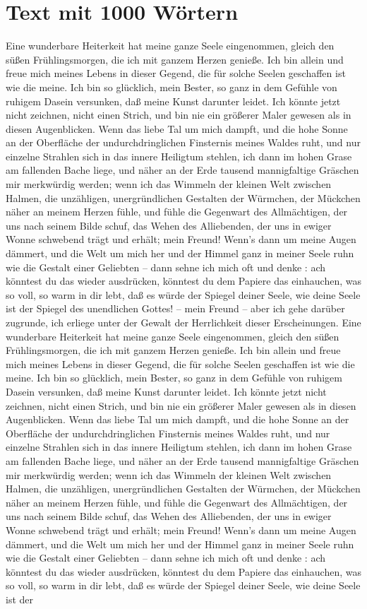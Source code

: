 \documentclass{scrreprt}
\begin{document}
	\chapter{Text mit 1000 Wörtern}
	Eine wunderbare Heiterkeit hat meine ganze Seele eingenommen, gleich den süßen Frühlingsmorgen, die ich mit ganzem Herzen genieße. Ich bin allein und freue mich meines Lebens in dieser Gegend, die für solche Seelen geschaffen ist wie die meine. Ich bin so glücklich, mein Bester, so ganz in dem Gefühle von ruhigem Dasein versunken, daß meine Kunst darunter leidet. Ich könnte jetzt nicht zeichnen, nicht einen Strich, und bin nie ein größerer Maler gewesen als in diesen Augenblicken. Wenn das liebe Tal um mich dampft, und die hohe Sonne an der Oberfläche der undurchdringlichen Finsternis meines Waldes ruht, und nur einzelne Strahlen sich in das innere Heiligtum stehlen, ich dann im hohen Grase am fallenden Bache liege, und näher an der Erde tausend mannigfaltige Gräschen mir merkwürdig werden; wenn ich das Wimmeln der kleinen Welt zwischen Halmen, die unzähligen, unergründlichen Gestalten der Würmchen, der Mückchen näher an meinem Herzen fühle, und fühle die Gegenwart des Allmächtigen, der uns nach seinem Bilde schuf, das Wehen des Alliebenden, der uns in ewiger Wonne schwebend trägt und erhält; mein Freund! Wenn’s dann um meine Augen dämmert, und die Welt um mich her und der Himmel ganz in meiner Seele ruhn wie die Gestalt einer Geliebten – dann sehne ich mich oft und denke : ach könntest du das wieder ausdrücken, könntest du dem Papiere das einhauchen, was so voll, so warm in dir lebt, daß es würde der Spiegel deiner Seele, wie deine Seele ist der Spiegel des unendlichen Gottes! – mein Freund – aber ich gehe darüber zugrunde, ich erliege unter der Gewalt der Herrlichkeit dieser Erscheinungen. Eine wunderbare Heiterkeit hat meine ganze Seele eingenommen, gleich den süßen Frühlingsmorgen, die ich mit ganzem Herzen genieße. Ich bin allein und freue mich meines Lebens in dieser Gegend, die für solche Seelen geschaffen ist wie die meine. Ich bin so glücklich, mein Bester, so ganz in dem Gefühle von ruhigem Dasein versunken, daß meine Kunst darunter leidet. Ich könnte jetzt nicht zeichnen, nicht einen Strich, und bin nie ein größerer Maler gewesen als in diesen Augenblicken. Wenn das liebe Tal um mich dampft, und die hohe Sonne an der Oberfläche der undurchdringlichen Finsternis meines Waldes ruht, und nur einzelne Strahlen sich in das innere Heiligtum stehlen, ich dann im hohen Grase am fallenden Bache liege, und näher an der Erde tausend mannigfaltige Gräschen mir merkwürdig werden; wenn ich das Wimmeln der kleinen Welt zwischen Halmen, die unzähligen, unergründlichen Gestalten der Würmchen, der Mückchen näher an meinem Herzen fühle, und fühle die Gegenwart des Allmächtigen, der uns nach seinem Bilde schuf, das Wehen des Alliebenden, der uns in ewiger Wonne schwebend trägt und erhält; mein Freund! Wenn’s dann um meine Augen dämmert, und die Welt um mich her und der Himmel ganz in meiner Seele ruhn wie die Gestalt einer Geliebten – dann sehne ich mich oft und denke : ach könntest du das wieder ausdrücken, könntest du dem Papiere das einhauchen, was so voll, so warm in dir lebt, daß es würde der Spiegel deiner Seele, wie deine Seele ist der 
\end{document}
